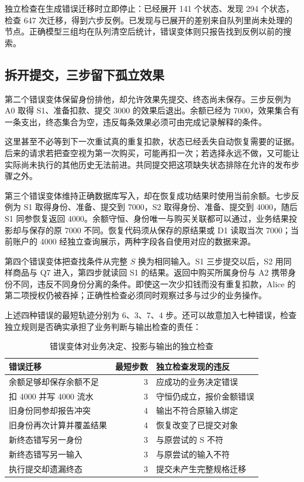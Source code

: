 独立检查在生成错误迁移时立即停止：已经展开 141 个状态、发现 294 个状态，检查 647 次迁移，得到六步反例。已发现与已展开的差别来自队列里尚未处理的节点。正确模型三组均在队列清空后统计，错误变体则只报告找到反例以前的搜索。

\subsection*{拆开提交，三步留下孤立效果}

第二个错误变体保留身份排他，却允许效果先提交、终态尚未保存。三步反例为 A0 取得 S1、准备扣款、提交 3000 的效果后退出。余额已经为 7000，效果集合有一条支出，终态集合为空，违反每条效果必须可由完成记录解释的条件。

这里甚至不必等到下一次重试真的重复扣款，状态已经丢失自动恢复需要的证据。后来的请求若把查空视为第一次购买，可能再扣一次；若选择永远不做，又可能让实际尚未执行的其他历史无法前进。共同提交把这项缺失状态排除在允许的发布步骤之外。



第三个错误变体维持正确数据库写入，却在恢复成功结果时使用当前余额。七步反例为 S1 取得身份、准备、提交到 7000，S2 取得身份、准备、提交到 4000，随后 S1 同参恢复返回 4000。余额守恒、身份唯一与购买关联都可以通过，业务结果投影却与保存的原 7000 不同。恢复代码须从保存的原结果或 D1 读取当次 7000；当前账户的 4000 经独立查询展示，两种字段各自使用对应的数据来源。



第四个错误变体把查找条件从完整 \(S\) 换为相同输入。S1 三步提交以后，S2 用同样商品与 Q7 进入，第四步就读回 S1 的结果。返回中购买所属身份与 A2 携带身份不同，违反不同身份分离的条件。即使这一次少扣钱而没有重复扣款，Alice 的第二项授权仍被吞掉；正确性检查必须同时观察过多与过少的业务操作。



上述四种错误的最短轨迹分别为 6、3、7、4 步。还可以故意加入七种错误，检查独立规则是否确实承担了业务判断与输出检查的责任：

\begin{table}[htbp]
\centering\small
\begin{tabularx}{\linewidth}{@{}XrX@{}}
\toprule
错误迁移 & 最短步数 & 独立检查发现的违反\\
\midrule
余额足够却保存余额不足 & 3 & 应成功的业务决定错误\\
扣 4000 并写 4000 流水 & 3 & 守恒仍成立，报价金额错误\\
旧身份同参却报告冲突 & 4 & 输出不符合原输入绑定\\
旧身份再次计算并覆盖结果 & 4 & 恢复改变了已提交对象\\
新终态错写另一身份 & 3 & 与原尝试的 S 不符\\
新终态错写另一输入 & 3 & 与原尝试的输入不符\\
执行提交却遗漏终态 & 3 & 提交未产生完整规格迁移\\
\bottomrule
\end{tabularx}
\caption{错误变体对业务决定、投影与输出的独立检查}
\end{table}


